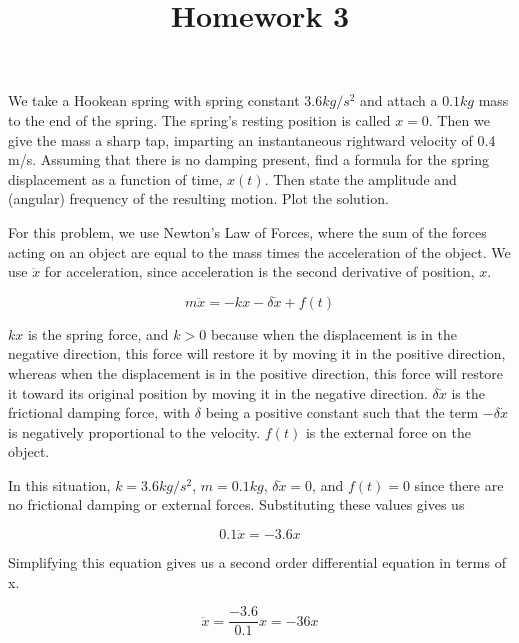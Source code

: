 \documentclass[11pt,answers]{exam}
\title{Homework 3}
\begin{document}
\begin{questions}

\addtocounter{question}{15}

\item We take a Hookean spring with spring constant $3.6 kg/s^2$ and attach a $0.1 kg$ mass to the end of the spring. The spring’s resting position is called $x = 0$. Then we give the mass a sharp tap, imparting an instantaneous rightward velocity of 0.4 m/s. Assuming that there is no damping present, find a formula for the spring displacement as a function of time, $x(t)$. Then state the amplitude and (angular) frequency of the resulting motion. Plot the solution.

\begin{solution}
\newline For this problem, we use Newton’s Law of Forces, where the sum of the forces acting on an object are equal to the mass times the acceleration of the object. We use $\ddot{x}$ for acceleration, since acceleration is the second derivative of position, $x$.

\begin{equation}
m \ddot{x} = -k x - \delta \dot{x} + f(t)
\end{equation}

$kx$ is the spring force, and $k > 0$ because when the displacement is in the negative direction, this force will restore it by moving it in the positive direction, whereas when the displacement is in the positive direction, this force will restore it toward its original position by moving it in the negative direction. $\delta \dot{x}$ is the frictional damping force, with $\delta$ being a positive constant such that the term $-\delta \dot{x}$ is negatively proportional to the velocity. 
$f(t)$ is the external force on the object.

In this situation, $k = 3.6 kg/s^{2}$, $m = 0.1 kg$, $\delta \dot{x} = 0$, and $f(t) = 0$ since there are no frictional damping or external forces. Substituting these values gives us 

\begin{equation}
0.1 \ddot{x} = -3.6 x
\end{equation}

Simplifying this equation gives us a second order differential equation in terms of x.

\begin{equation}
\ddot{x} = \frac{-3.6}{0.1} x = -36 x
\end{equation}


\end{solution}
\end{questions}
\end{document}
